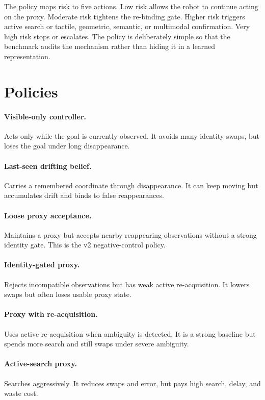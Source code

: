 \documentclass{article}
\begin{document}
The policy maps risk to five actions. Low risk allows the robot to continue acting on the proxy. Moderate risk tightens the re-binding gate. Higher risk triggers active search or tactile, geometric, semantic, or multimodal confirmation. Very high risk stops or escalates. The policy is deliberately simple so that the benchmark audits the mechanism rather than hiding it in a learned representation.

\section{Policies}

\paragraph{Visible-only controller.}
Acts only while the goal is currently observed. It avoids many identity swaps, but loses the goal under long disappearance.

\paragraph{Last-seen drifting belief.}
Carries a remembered coordinate through disappearance. It can keep moving but accumulates drift and binds to false reappearances.

\paragraph{Loose proxy acceptance.}
Maintains a proxy but accepts nearby reappearing observations without a strong identity gate. This is the v2 negative-control policy.

\paragraph{Identity-gated proxy.}
Rejects incompatible observations but has weak active re-acquisition. It lowers swaps but often loses usable proxy state.

\paragraph{Proxy with re-acquisition.}
Uses active re-acquisition when ambiguity is detected. It is a strong baseline but spends more search and still swaps under severe ambiguity.

\paragraph{Active-search proxy.}
Searches aggressively. It reduces swaps and error, but pays high search, delay, and waste cost.
\end{document}
